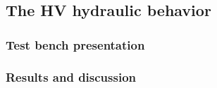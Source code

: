 \documentclass[3p,twocolumn,preprint]{elsarticle}
\begin{document}
	\subsection{The HV hydraulic behavior}	
	\label{The hydraulic valves}

	\subsubsection{Test bench presentation}

	\subsubsection{Results and discussion}
\end{document}
